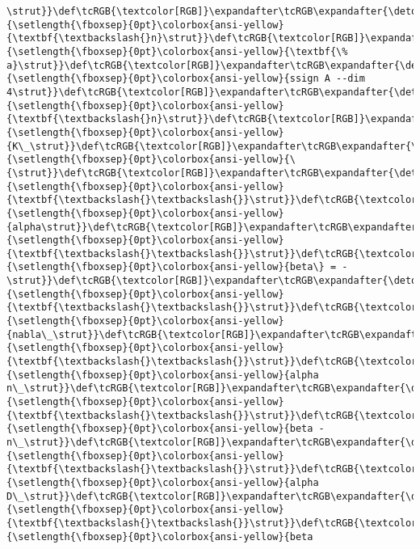 \documentclass[landscape,letterpaper,10pt,english]{article}
\begin{document}
\begin{Verbatim}[commandchars=\\\{\}, frame=single, framerule=2mm, rulecolor=\color{outerrorbackground}]
\strut}}\def\tcRGB{\textcolor[RGB]}\expandafter\tcRGB\expandafter{\detokenize{175,95,0}}{\setlength{\fboxsep}{0pt}\colorbox{ansi-yellow}{\textbf{\textbackslash{}n}\strut}}\def\tcRGB{\textcolor[RGB]}\expandafter\tcRGB\expandafter{\detokenize{175,95,135}}{\setlength{\fboxsep}{0pt}\colorbox{ansi-yellow}{\textbf{\% a}\strut}}\def\tcRGB{\textcolor[RGB]}\expandafter\tcRGB\expandafter{\detokenize{175,0,0}}{\setlength{\fboxsep}{0pt}\colorbox{ansi-yellow}{ssign A --dim 4\strut}}\def\tcRGB{\textcolor[RGB]}\expandafter\tcRGB\expandafter{\detokenize{175,95,0}}{\setlength{\fboxsep}{0pt}\colorbox{ansi-yellow}{\textbf{\textbackslash{}n}\strut}}\def\tcRGB{\textcolor[RGB]}\expandafter\tcRGB\expandafter{\detokenize{175,0,0}}{\setlength{\fboxsep}{0pt}\colorbox{ansi-yellow}{K\_\strut}}\def\tcRGB{\textcolor[RGB]}\expandafter\tcRGB\expandafter{\detokenize{175,0,0}}{\setlength{\fboxsep}{0pt}\colorbox{ansi-yellow}{\{\strut}}\def\tcRGB{\textcolor[RGB]}\expandafter\tcRGB\expandafter{\detokenize{175,95,0}}{\setlength{\fboxsep}{0pt}\colorbox{ansi-yellow}{\textbf{\textbackslash{}\textbackslash{}}\strut}}\def\tcRGB{\textcolor[RGB]}\expandafter\tcRGB\expandafter{\detokenize{175,0,0}}{\setlength{\fboxsep}{0pt}\colorbox{ansi-yellow}{alpha\strut}}\def\tcRGB{\textcolor[RGB]}\expandafter\tcRGB\expandafter{\detokenize{175,95,0}}{\setlength{\fboxsep}{0pt}\colorbox{ansi-yellow}{\textbf{\textbackslash{}\textbackslash{}}\strut}}\def\tcRGB{\textcolor[RGB]}\expandafter\tcRGB\expandafter{\detokenize{175,0,0}}{\setlength{\fboxsep}{0pt}\colorbox{ansi-yellow}{beta\} = -\strut}}\def\tcRGB{\textcolor[RGB]}\expandafter\tcRGB\expandafter{\detokenize{175,95,0}}{\setlength{\fboxsep}{0pt}\colorbox{ansi-yellow}{\textbf{\textbackslash{}\textbackslash{}}\strut}}\def\tcRGB{\textcolor[RGB]}\expandafter\tcRGB\expandafter{\detokenize{175,0,0}}{\setlength{\fboxsep}{0pt}\colorbox{ansi-yellow}{nabla\_\strut}}\def\tcRGB{\textcolor[RGB]}\expandafter\tcRGB\expandafter{\detokenize{175,95,0}}{\setlength{\fboxsep}{0pt}\colorbox{ansi-yellow}{\textbf{\textbackslash{}\textbackslash{}}\strut}}\def\tcRGB{\textcolor[RGB]}\expandafter\tcRGB\expandafter{\detokenize{175,0,0}}{\setlength{\fboxsep}{0pt}\colorbox{ansi-yellow}{alpha n\_\strut}}\def\tcRGB{\textcolor[RGB]}\expandafter\tcRGB\expandafter{\detokenize{175,95,0}}{\setlength{\fboxsep}{0pt}\colorbox{ansi-yellow}{\textbf{\textbackslash{}\textbackslash{}}\strut}}\def\tcRGB{\textcolor[RGB]}\expandafter\tcRGB\expandafter{\detokenize{175,0,0}}{\setlength{\fboxsep}{0pt}\colorbox{ansi-yellow}{beta - n\_\strut}}\def\tcRGB{\textcolor[RGB]}\expandafter\tcRGB\expandafter{\detokenize{175,95,0}}{\setlength{\fboxsep}{0pt}\colorbox{ansi-yellow}{\textbf{\textbackslash{}\textbackslash{}}\strut}}\def\tcRGB{\textcolor[RGB]}\expandafter\tcRGB\expandafter{\detokenize{175,0,0}}{\setlength{\fboxsep}{0pt}\colorbox{ansi-yellow}{alpha D\_\strut}}\def\tcRGB{\textcolor[RGB]}\expandafter\tcRGB\expandafter{\detokenize{175,95,0}}{\setlength{\fboxsep}{0pt}\colorbox{ansi-yellow}{\textbf{\textbackslash{}\textbackslash{}}\strut}}\def\tcRGB{\textcolor[RGB]}\expandafter\tcRGB\expandafter{\detokenize{175,0,0}}{\setlength{\fboxsep}{0pt}\colorbox{ansi-yellow}{beta 
\end{Verbatim}
\end{document}
